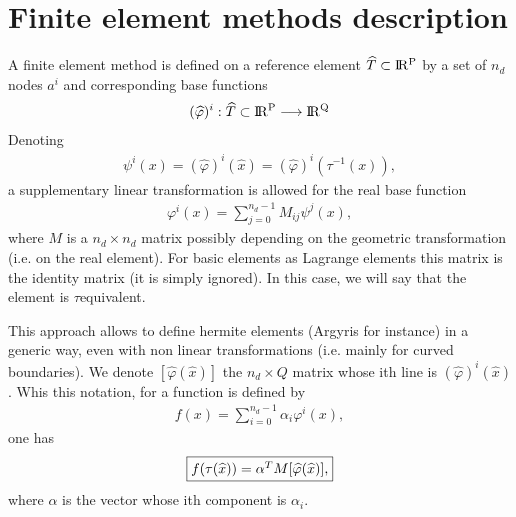 \documentclass[a4paper,11pt,english]{sphinxmanual}
\begin{document}
\section{Finite element methods description}
\label{\detokenize{project/femdesc:finite-element-methods-description}}
A finite element method is defined on a reference element
\(\widehat{T}\subset\rm I\hspace{-0.15em}R^P\) by a set of \(n_d\) nodes \(a^i\) and
corresponding base functions
\begin{equation*}
\begin{split}(\widehat{\varphi})^i : \widehat{T}\subset\rm I\hspace{-0.15em}R^P \longrightarrow \rm I\hspace{-0.15em}R^Q\end{split}
\end{equation*}
Denoting
\begin{equation*}
\begin{split}\psi^i(x) = (\widehat{\varphi})^i(\widehat{x}) = (\widehat{\varphi})^i(\tau^{-1}(x)),\end{split}
\end{equation*}
a supplementary linear transformation is allowed for the real base function
\begin{equation*}
\begin{split}\varphi^i(x) = \sum_{j = 0}^{n_d - 1} M_{ij} \psi^j(x),\end{split}
\end{equation*}
where \(M\) is a \(n_d \times n_d\) matrix possibly depending on the
geometric transformation (i.e. on the real element). For basic elements as
Lagrange elements this matrix is the identity matrix (it is simply ignored). In
this case, we will say that the element is \(\tau\)\sphinxhyphen{}equivalent.

This approach allows to define hermite elements (Argyris for instance) in a
generic way, even with non linear transformations (i.e. mainly for curved
boundaries). We denote \([\widehat{\varphi}(\widehat{x})]\) the \(n_d \times Q\) matrix
whose ith line is \((\widehat{\varphi})^i(\widehat{x})\). Whis this notation, for a function is
defined by
\begin{equation*}
\begin{split}f(x) = \sum_{i = 0}^{n_d - 1} \alpha_i \varphi^i(x),\end{split}
\end{equation*}
one has
\begin{equation*}
\begin{split}\fbox{$f(\tau(\widehat{x})) = \alpha^T M [\widehat{\varphi}(\widehat{x})]$,}\end{split}
\end{equation*}
where \(\alpha\) is the vector whose ith component is \(\alpha_i\).
\end{document}
